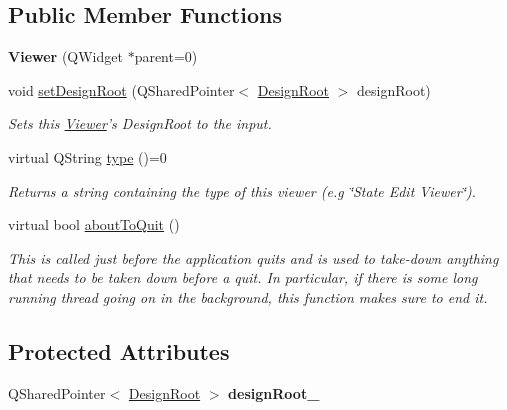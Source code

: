 \subsection*{Public Member Functions}
\begin{DoxyCompactItemize}
\item 
\hypertarget{class_viewer_a6a1f845092e1d4407adabb550e40431b}{{\bfseries Viewer} (Q\-Widget $\ast$parent=0)}\label{class_viewer_a6a1f845092e1d4407adabb550e40431b}

\item 
\hypertarget{class_viewer_a2006f795f8a96b722d21f0cc982ae111}{void \hyperlink{class_viewer_a2006f795f8a96b722d21f0cc982ae111}{set\-Design\-Root} (Q\-Shared\-Pointer$<$ \hyperlink{class_picto_1_1_design_root}{Design\-Root} $>$ design\-Root)}\label{class_viewer_a2006f795f8a96b722d21f0cc982ae111}

\begin{DoxyCompactList}\small\item\em Sets this \hyperlink{class_viewer}{Viewer}'s Design\-Root to the input. \end{DoxyCompactList}\item 
\hypertarget{class_viewer_aa27fe7a15dfe5ee65389b681fc5f57d9}{virtual Q\-String \hyperlink{class_viewer_aa27fe7a15dfe5ee65389b681fc5f57d9}{type} ()=0}\label{class_viewer_aa27fe7a15dfe5ee65389b681fc5f57d9}

\begin{DoxyCompactList}\small\item\em Returns a string containing the type of this viewer (e.\-g \char`\"{}\-State Edit Viewer\char`\"{}). \end{DoxyCompactList}\item 
\hypertarget{class_viewer_a36fd548283a09aeec9a56819287bf782}{virtual bool \hyperlink{class_viewer_a36fd548283a09aeec9a56819287bf782}{about\-To\-Quit} ()}\label{class_viewer_a36fd548283a09aeec9a56819287bf782}

\begin{DoxyCompactList}\small\item\em This is called just before the application quits and is used to take-\/down anything that needs to be taken down before a quit. In particular, if there is some long running thread going on in the background, this function makes sure to end it. \end{DoxyCompactList}\end{DoxyCompactItemize}
\subsection*{Protected Attributes}
\begin{DoxyCompactItemize}
\item 
\hypertarget{class_viewer_a73547dcfee4688dc5f7f47c25fcae0e3}{Q\-Shared\-Pointer$<$ \hyperlink{class_picto_1_1_design_root}{Design\-Root} $>$ {\bfseries design\-Root\-\_\-}}\label{class_viewer_a73547dcfee4688dc5f7f47c25fcae0e3}

\end{DoxyCompactItemize}


